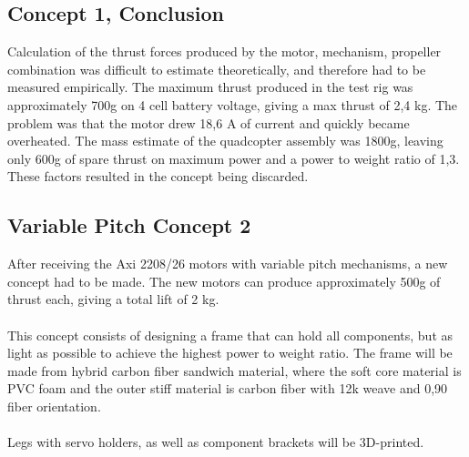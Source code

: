 \subsection{Concept 1, Conclusion}

Calculation of the thrust forces produced by the motor, mechanism, propeller combination was difficult to estimate theoretically, and therefore had to be measured empirically. The maximum thrust produced in the test rig was approximately 700g on 4 cell battery voltage, giving a max thrust of 2,4 kg. The problem was that the motor drew 18,6 A of current and quickly became overheated. The mass estimate of the quadcopter assembly was 1800g, leaving only 600g of spare thrust on maximum power and a power to weight ratio of 1,3. These factors resulted in the concept being discarded.

\subsection{Variable Pitch Concept 2}

After receiving the Axi 2208/26 motors with variable pitch mechanisms, a new concept had to be made. The new motors can produce approximately 500g of thrust each, giving a total lift of 2 kg.
\\\\
This concept consists of designing a frame that can hold all components, but as light as possible to achieve the highest power to weight ratio. The frame will be made from hybrid carbon fiber sandwich material, where the soft core material is PVC foam and the outer stiff material is carbon fiber with 12k weave and 0,90 fiber orientation.
\\\\
Legs with servo holders, as well as component brackets will be 3D-printed.


